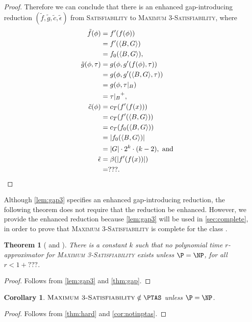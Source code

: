 \documentclass[]{article}
\theoremstyle{plain}
\newtheorem{corollary}{Corollary}
\newtheorem{theorem}{Theorem}
\theoremstyle{definition}
\newcommand{\pair}[2]{{\left\langle{#1}, {#2}\right\rangle}}
\begin{document}
\begin{proof}
  Therefore we can conclude that there is an enhanced gap-introducing reduction $(\tilde{f}, \tilde{g}, \tilde{c}, \tilde{\epsilon})$ from \textsc{Satisfiability} to \textsc{Maximum 3-Satisfiability}, where
  \begin{align*}
    \tilde{f}(\phi) & = f'(f(\phi)) \\
    & = f'(\pair{B}{G}) \\
    & = f_0(\pair{B}{G}), \\
    \tilde{g}(\phi, \tau) & = g(\phi, g'(f(\phi), \tau)) \\
    & = g(\phi, g'(\pair{B}{G}, \tau)) \\
    & = g(\phi, \tau|_B) \\
    & = {\tau|_B}^+, \\
    \tilde{c}(\phi) & = c_T(f'(f(x))) \\
    & = c_T(f'(\pair{B}{G})) \\
    & = c_T(f_0(\pair{B}{G})) \\
    & = |f_0(\pair{B}{G})| \\
    & = |G| \cdot 2^k \cdot (k - 2), \text{ and} \\
    \tilde{\epsilon} & = \beta(|f'(f(x))|) \\
    & = ???. \qedhere
  \end{align*}
\end{proof}

Although \autoref{lem:gap3} specifies an enhanced gap-introducing reduction, the following theorem does not require that the reduction be enhanced.
However, we provide the enhanced reduction because \autoref{lem:gap3} will be used in \autoref{sec:complete}, in order to prove that \textsc{Maximum 3-Satisfiability} is complete for the class \APX.

\begin{theorem}[{\cite[Theorem~6.3]{book}} and {\cite[Corollary~29.8]{vazirani}}]\label{thm:hard}
  There is a constant $k$ such that no polynomial time $r$-approximator for \textsc{Maximum 3-Satisfiability} exists unless $\P = \NP$, for all $r < 1 + ???$.
\end{theorem}
\begin{proof}
  Follows from \autoref{lem:gap3} and \autoref{thm:gap}.
\end{proof}

\begin{corollary}
  $\textsc{Maximum 3-Satisfiability} \notin \PTAS$ unless $\P = \NP$.
\end{corollary}
\begin{proof}
  Follows from \autoref{thm:hard} and \autoref{cor:notinptas}.
\end{proof}
\end{document}

